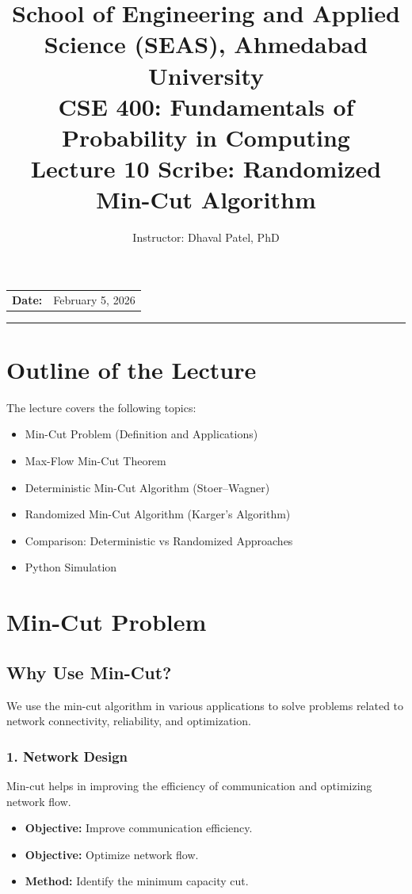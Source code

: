 \documentclass[11pt]{article}
\title{
    \normalsize School of Engineering and Applied Science (SEAS), Ahmedabad University \\
    \vspace{0.2cm}
    \textbf{CSE 400: Fundamentals of Probability in Computing}\\
    \Large Lecture 10 Scribe: Randomized Min-Cut Algorithm
}
\author{Instructor: Dhaval Patel, PhD}
\date{}
\begin{document}
\maketitle

\vspace{-1cm}
\begin{center}
    \begin{tabular}{ll}
        \textbf{Date:} & {February 5, 2026 \hspace{2.2in}} \\ [1.5ex]
        
    \end{tabular}
\end{center}

\hrule
\vspace{0.5cm}


\section{Outline of the Lecture}
The lecture covers the following topics:
\begin{itemize}
    \item Min-Cut Problem (Definition and Applications)
    \item Max-Flow Min-Cut Theorem
    \item Deterministic Min-Cut Algorithm (Stoer--Wagner)
    \item Randomized Min-Cut Algorithm (Karger’s Algorithm)
    \item Comparison: Deterministic vs Randomized Approaches
    \item Python Simulation
\end{itemize}

\section{Min-Cut Problem}

\subsection{Why Use Min-Cut?}
We use the min-cut algorithm in various applications to solve problems related to network connectivity, reliability, and optimization.

\subsubsection*{1. Network Design}
Min-cut helps in improving the efficiency of communication and optimizing network flow.
\begin{itemize}
    \item \textbf{Objective:} Improve communication efficiency.
    \item \textbf{Objective:} Optimize network flow.
    \item \textbf{Method:} Identify the minimum capacity cut.
\end{itemize}
\end{document}
